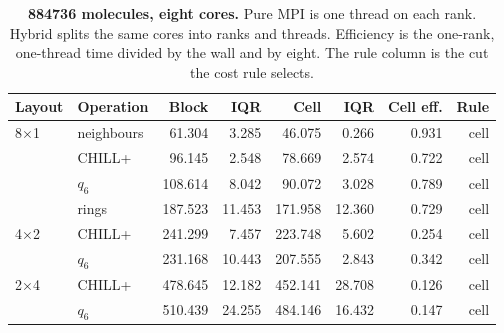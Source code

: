 \begin{table}[tbp]
\centering
\caption{\textbf{884736 molecules, eight cores.} Pure MPI is one thread on each rank. Hybrid splits the same cores into ranks and threads. Efficiency is the one-rank, one-thread time divided by the wall and by eight. The rule column is the cut the cost rule selects.}
\label{tab:partition-v16}
\begin{tabular}{llrrrrrr}
\toprule
Layout & Operation & Block & IQR & Cell & IQR & Cell eff. & Rule \\
\midrule
8$\times$1 & neighbours & 61.304 & 3.285 & 46.075 & 0.266 & 0.931 & cell \\
 & CHILL+ & 96.145 & 2.548 & 78.669 & 2.574 & 0.722 & cell \\
 & $q_6$ & 108.614 & 8.042 & 90.072 & 3.028 & 0.789 & cell \\
 & rings & 187.523 & 11.453 & 171.958 & 12.360 & 0.729 & cell \\
4$\times$2 & CHILL+ & 241.299 & 7.457 & 223.748 & 5.602 & 0.254 & cell \\
 & $q_6$ & 231.168 & 10.443 & 207.555 & 2.843 & 0.342 & cell \\
2$\times$4 & CHILL+ & 478.645 & 12.182 & 452.141 & 28.708 & 0.126 & cell \\
 & $q_6$ & 510.439 & 24.255 & 484.146 & 16.432 & 0.147 & cell \\
\bottomrule
\end{tabular}
\end{table}
